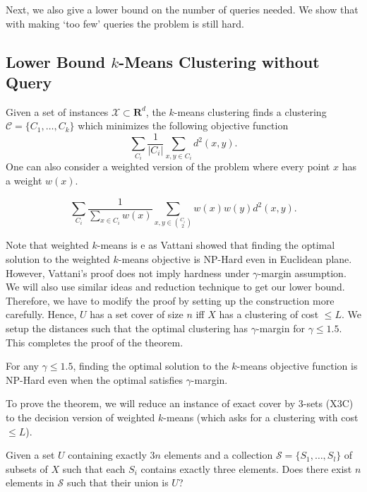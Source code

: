 \documentclass[orivec]{llncs}
\newcommand{\mc}{\mathcal}
\newcommand{\mb}{\mathbf}
\begin{document}
Next, we also give a lower bound on the number of queries needed. We show that with making `too few' queries the problem is still hard.


\subsection{Lower Bound $k$-Means Clustering without Query}
Given a set of instances $\mc X \subset \mb R ^d$, the $k$-means clustering finds a clustering $\mc C = \{C_1, \ldots, C_k\}$ which minimizes the following objective function
$$\sum\limits_{C_i}\frac{1}{|C_i|} \sum_{x, y \in C_i} d^2(x, y).$$
One can also consider a weighted version of the problem where every point $x$ has a weight $w(x)$. 

$$\sum\limits_{C_i}\frac{1}{\sum_{x \in C_i}w(x)} \sum_{x, y \in {C_i \choose 2}} w(x)w(y)d^2(x, y).$$ 

Note that weighted $k$-means is e as Vattani showed \cite{vattani2009hardness} that finding the optimal solution to the weighted $k$-means objective is NP-Hard even in Euclidean plane. However, Vattani's proof does not imply hardness under $\gamma$-margin assumption. We will also use similar ideas and reduction technique to get our lower bound. Therefore, we have to modify the proof by setting up the construction more carefully. Hence, $U$ has a set cover of size $n$ iff $X$ has a clustering of cost $\le L$. We setup the distances such that the optimal clustering has $\gamma$-margin for $\gamma \le 1.5$. This completes the proof of the theorem.  

\begin{theorem}
\label{thm:gammaLower}
For any $\gamma \le 1.5$, finding the optimal solution to the $k$-means objective function is NP-Hard even when the optimal satisfies $\gamma$-margin.
\end{theorem}
To prove the theorem, we will reduce an instance of exact cover by 3-sets (X3C) to the decision version of weighted $k$-means (which asks for a clustering with cost $\le L$). 
\begin{definition}[X3C]
Given a set $U$ containing exactly $3n$ elements and a collection $\mc S = \{S_1, \ldots, S_l\}$ of subsets of $X$ such that each $S_i$ contains exactly three elements. Does there exist $n$ elements in $\mc S$ such that their union is $U$? 
\end{definition}
\end{document}
